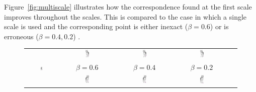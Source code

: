 Figure~\ref{fig:multiscale} illustrates how the correspondence found at the first scale  improves throughout the scales.
This is compared to the case in which a single scale is used and the corresponding point is either inexact ($\beta=0.6$) or is erroneous ($\beta=0.4,0.2$) .
\begin{figure}[htb]
	\centering
	\begin{tabular}{c|ccc|c}
		
		\multirow{ 3}{*}{ { \includegraphics[width=0.06\textwidth]{figures/Original.png}}}
		&
		\includegraphics[width=0.07\textwidth]{figures/B0_6result.png} &
		\includegraphics[width=0.07\textwidth]{figures/B0_4result.png} &
		\includegraphics[width=0.07\textwidth]{figures/B0_2result.png} & \rotatebox{90}{Single scale results}
		\\
		& $\beta=0.6$ & $\beta=0.4$ & $\beta=0.2$ \\
		\cline{2-5}
		&\includegraphics[width=0.07\textwidth]{figures/B0_6MSDIS.png} &
		\includegraphics[width=0.07\textwidth]{figures/B0_4MSDIS.png} &
		\includegraphics[width=0.07\textwidth]{figures/B0_2MSDIS.png} &

\end{tabular}
\end{figure}

